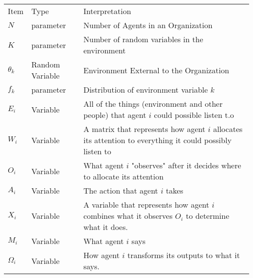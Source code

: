 \documentclass{article}
\begin{document}
\begin{table}[h!]
\centering
\begin{tabular}{|p{1in}|p{1.5in}|p{3in}|}
\hline
Item       & Type            & Interpretation                                                                                           \\
$N$          & parameter       & Number of Agents in an Organization                                                                      \\
$K$          & parameter       & Number of random variables in the environment                                                            \\
$\theta_k$ & Random Variable & Environment External to the Organization                                                                 \\
$f_k$      & parameter       & Distribution of environment variable $k$                                                                 \\
$E_i$      & Variable        & All of the things (environment and other people) that agent $i$ could possible listen t.o                \\
$W_i$      & Variable        & A matrix that represents how agent $i$ allocates its attention to everything it could possibly listen to \\
$O_i$      & Variable        & What agent $i$ "observes" after it decides where to allocate its attention                               \\
$A_i$      & Variable        & The action that agent $i$ takes                                                                          \\
$X_i$      & Variable        & A variable that represents how agent $i$ combines what it observes $O_i$ to determine what it does.      \\
$M_i$      & Variable        & What agent $i$ says                                                                                      \\
$\Omega_i$ & Variable        & How agent $i$ transforms its outputs to
                               what it says.
  \\ \hline
\end{tabular}
\end{table}
\end{document}
